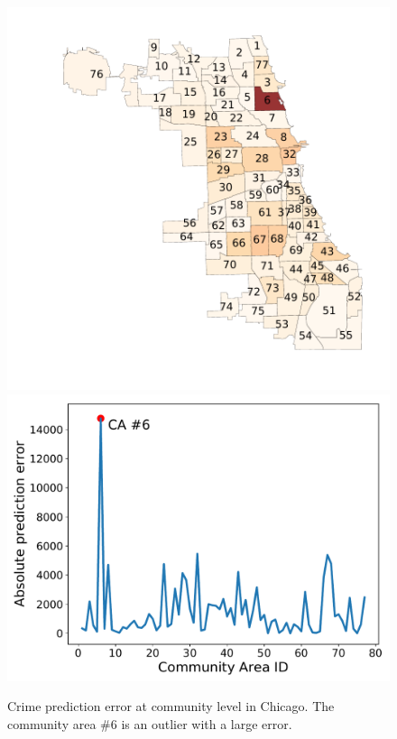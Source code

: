 \begin{figure}[t]
\centering
\includegraphics[width=0.4\linewidth]{fig/error_heatmap.pdf}
\includegraphics[width=0.5\linewidth]{fig/ca-abs-errors.pdf}
\caption{Crime prediction error at community level in Chicago. The community area \#6 is an outlier with a large error.}
\label{fig:intro}
\end{figure}

